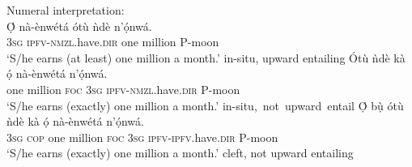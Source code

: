 \documentclass[output=paper,colorlinks,citecolor=brown]{langscibook}
\begin{document}
\ea%
    \label{ex:amaechi:10}
    Numeral interpretation:\\
    \ea\label{ex:amaechi:10a}
    \gll    \d{\'O} n\`a-\`enw\'et\'a \'ot\`u \`nd\`e n'\d{\'o}nw\'a.\\
            3\textsc{sg} \textsc{ipfv}-\textsc{nmzl}.have.\textsc{dir} one million P-moon\\
    \glt    `S/he earns (at least) one million a month.' \hfill{in-situ, upward entailing}
    \ex\label{ex:amaechi:10b}
    \gll    \'Ot\`u \`nd\`e k\`a \d{\'o} n\`a-\`enw\'et\'a n'\d{\'o}nw\'a.\\
            one million \textsc{foc} 3\textsc{sg} \textsc{ipfv}-\textsc{nmzl}.have.\textsc{dir} P-moon\\
    \glt    `S/he earns (exactly) one million a month.' \hfill{in-situ,~not~upward~entail}
    \ex\label{ex:amaechi:10c}
    \gll    \d{\'O} b\d{\`u} \'ot\`u \`nd\`e k\`a \d{\'o} n\`a-\`enw\'et\'a n'\d{\'o}nw\'a.\\
            3\textsc{sg} \textsc{cop} one million \textsc{foc} 3\textsc{sg} \textsc{ipfv}-\textsc{ipfv}.have.\textsc{dir} P-moon\\
    \glt    `S/he earns (exactly) one million a month.' \hfill{cleft, not upward entailing}
    \z
\z


\end{document}
